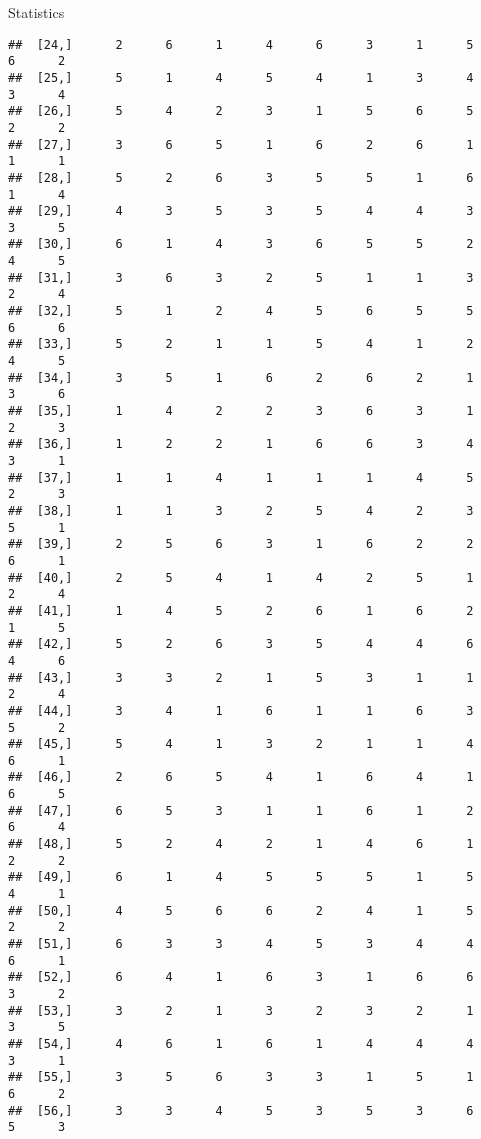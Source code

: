 \documentclass[
  ignorenonframetext,
]{beamer}
\begin{document}
\begin{frame}[fragile]{Statistics}
\begin{verbatim}
##  [24,]      2      6      1      4      6      3      1      5      6      2
##  [25,]      5      1      4      5      4      1      3      4      3      4
##  [26,]      5      4      2      3      1      5      6      5      2      2
##  [27,]      3      6      5      1      6      2      6      1      1      1
##  [28,]      5      2      6      3      5      5      1      6      1      4
##  [29,]      4      3      5      3      5      4      4      3      3      5
##  [30,]      6      1      4      3      6      5      5      2      4      5
##  [31,]      3      6      3      2      5      1      1      3      2      4
##  [32,]      5      1      2      4      5      6      5      5      6      6
##  [33,]      5      2      1      1      5      4      1      2      4      5
##  [34,]      3      5      1      6      2      6      2      1      3      6
##  [35,]      1      4      2      2      3      6      3      1      2      3
##  [36,]      1      2      2      1      6      6      3      4      3      1
##  [37,]      1      1      4      1      1      1      4      5      2      3
##  [38,]      1      1      3      2      5      4      2      3      5      1
##  [39,]      2      5      6      3      1      6      2      2      6      1
##  [40,]      2      5      4      1      4      2      5      1      2      4
##  [41,]      1      4      5      2      6      1      6      2      1      5
##  [42,]      5      2      6      3      5      4      4      6      4      6
##  [43,]      3      3      2      1      5      3      1      1      2      4
##  [44,]      3      4      1      6      1      1      6      3      5      2
##  [45,]      5      4      1      3      2      1      1      4      6      1
##  [46,]      2      6      5      4      1      6      4      1      6      5
##  [47,]      6      5      3      1      1      6      1      2      6      4
##  [48,]      5      2      4      2      1      4      6      1      2      2
##  [49,]      6      1      4      5      5      5      1      5      4      1
##  [50,]      4      5      6      6      2      4      1      5      2      2
##  [51,]      6      3      3      4      5      3      4      4      6      1
##  [52,]      6      4      1      6      3      1      6      6      3      2
##  [53,]      3      2      1      3      2      3      2      1      3      5
##  [54,]      4      6      1      6      1      4      4      4      3      1
##  [55,]      3      5      6      3      3      1      5      1      6      2
##  [56,]      3      3      4      5      3      5      3      6      5      3

\end{verbatim}
\end{frame}
\end{document}
